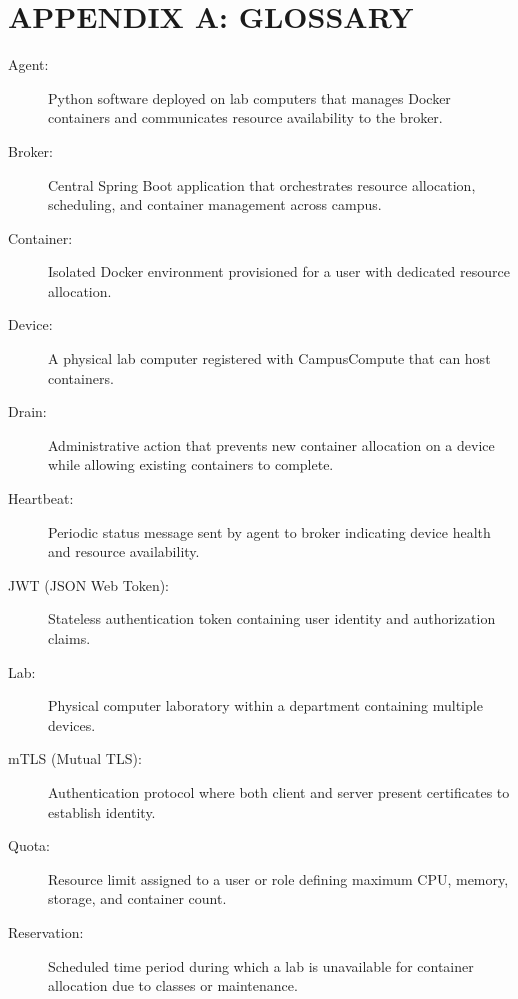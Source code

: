\documentclass[12pt,a4paper]{article}
\begin{document}
\newpage

\section*{APPENDIX A: GLOSSARY}
\label{app:glossary}

\begin{description}
    \item[Agent:] Python software deployed on lab computers that manages Docker containers and communicates resource availability to the broker.
    
    \item[Broker:] Central Spring Boot application that orchestrates resource allocation, scheduling, and container management across campus.
    
    \item[Container:] Isolated Docker environment provisioned for a user with dedicated resource allocation.
    \item[Device:] A physical lab computer registered with CampusCompute that can host containers.
    
    \item[Drain:] Administrative action that prevents new container allocation on a device while allowing existing containers to complete.
    
    \item[Heartbeat:] Periodic status message sent by agent to broker indicating device health and resource availability.
    
    \item[JWT (JSON Web Token):] Stateless authentication token containing user identity and authorization claims.
    
    \item[Lab:] Physical computer laboratory within a department containing multiple devices.
    
    \item[mTLS (Mutual TLS):] Authentication protocol where both client and server present certificates to establish identity.
    
    \item[Quota:] Resource limit assigned to a user or role defining maximum CPU, memory, storage, and container count.
    
    \item[Reservation:] Scheduled time period during which a lab is unavailable for container allocation due to classes or maintenance.
    

\end{description}
\end{document}
